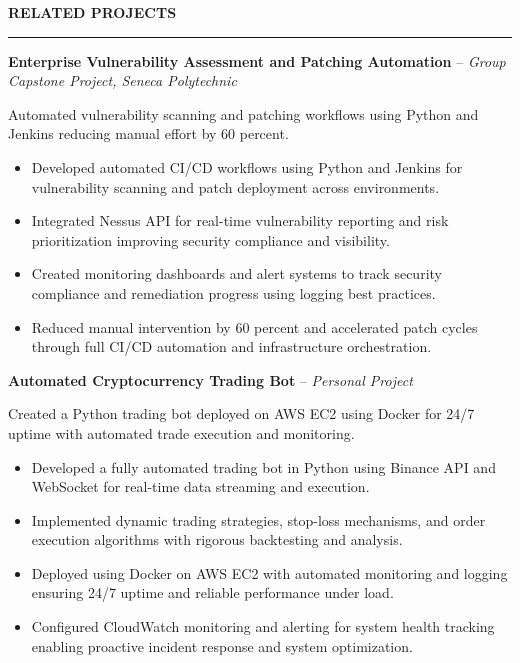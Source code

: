 \documentclass[10pt,letterpaper]{article}
\begin{document}
\vspace{6pt}

\textbf{RELATED PROJECTS}\\[-8pt]
\noindent\rule{\textwidth}{1pt}

\vspace{-2pt}

\textbf{Enterprise Vulnerability Assessment and Patching Automation} -- \emph{Group Capstone Project, Seneca Polytechnic}

\vspace{-1pt}

Automated vulnerability scanning and patching workflows using Python and Jenkins reducing manual effort by 60 percent.
\vspace{-1pt}
\begin{itemize}
\item Developed automated CI/CD workflows using Python and Jenkins for vulnerability scanning and patch deployment across environments.
\item Integrated Nessus API for real-time vulnerability reporting and risk prioritization improving security compliance and visibility.
\item Created monitoring dashboards and alert systems to track security compliance and remediation progress using logging best practices.
\item Reduced manual intervention by 60 percent and accelerated patch cycles through full CI/CD automation and infrastructure orchestration.
\end{itemize}

\textbf{Automated Cryptocurrency Trading Bot} -- \emph{Personal Project}

\vspace{-1pt}

Created a Python trading bot deployed on AWS EC2 using Docker for 24/7 uptime with automated trade execution and monitoring.
\vspace{-1pt}
\begin{itemize}
\item Developed a fully automated trading bot in Python using Binance API and WebSocket for real-time data streaming and execution.
\item Implemented dynamic trading strategies, stop-loss mechanisms, and order execution algorithms with rigorous backtesting and analysis.
\item Deployed using Docker on AWS EC2 with automated monitoring and logging ensuring 24/7 uptime and reliable performance under load.
\item Configured CloudWatch monitoring and alerting for system health tracking enabling proactive incident response and system optimization.
\end{itemize}
\end{document}
